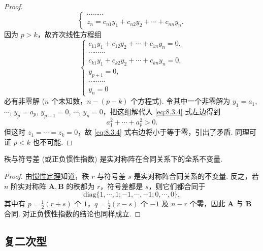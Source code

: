\documentclass[../../main.tex]{subfiles}
\begin{document}
\begin{proof}
\[\begin{cases}
\cdots\cdots\cdots\\
z_n = c_{n1}y_1 + c_{n2}y_2 + \cdots + c_{nn}y_n.
\end{cases}
\]
因为 $p>k$，故齐次线性方程组
\[
\begin{cases}
c_{11}y_1 + c_{12}y_2 + \cdots + c_{1n}y_n = 0,\\
\cdots\cdots\cdots\\
c_{k1}y_1 + c_{k2}y_2 + \cdots + c_{kn}y_n = 0,\\
y_{p + 1} = 0,\\
\cdots\cdots\cdots\\
y_n = 0
\end{cases}
\]
必有非零解 ($n$ 个未知数，$n - (p - k)$ 个方程式). 令其中一个非零解为 $y_1 = a_1$, $\cdots$, $y_p = a_p$, $y_{p + 1} = 0$, $\cdots$, $y_n = 0$，把这组解代入 \eqref{eq:8.3.4} 式左边得到
\[
a_1^2+\cdots + a_p^2>0.
\]
但这时 $z_1 = \cdots = z_k = 0$，故 \eqref{eq:8.3.4} 式右边将小于等于零，引出了矛盾. 同理可证 $p<k$ 也不可能.
\end{proof}

\begin{theorem}\label{theorem:秩与符号差(或正负惯性指数)都是实对称阵在合同关系下的全系不变量}
秩与符号差 (或正负惯性指数) 是实对称阵在合同关系下的全系不变量.
\end{theorem}
\begin{proof}
由\hyperref[theorem:惯性定理]{惯性定理}知道，秩 $r$ 与符号差 $s$ 是实对称阵合同关系的不变量. 反之，若 $n$ 阶实对称阵 $\boldsymbol{A},\boldsymbol{B}$ 的秩都为 $r$，符号差都是 $s$，则它们都合同于
\[
\mathrm{diag}\{1,\cdots,1;-1,\cdots,-1;0,\cdots,0\},
\]
其中有 $p = \frac{1}{2}(r + s)$ 个 $1$，$q = \frac{1}{2}(r - s)$ 个 $-1$ 及 $n - r$ 个零，因此 $\boldsymbol{A}$ 与 $\boldsymbol{B}$ 合同. 对正负惯性指数的结论也同样成立. 
\end{proof}


\subsection{复二次型}
\end{document}
